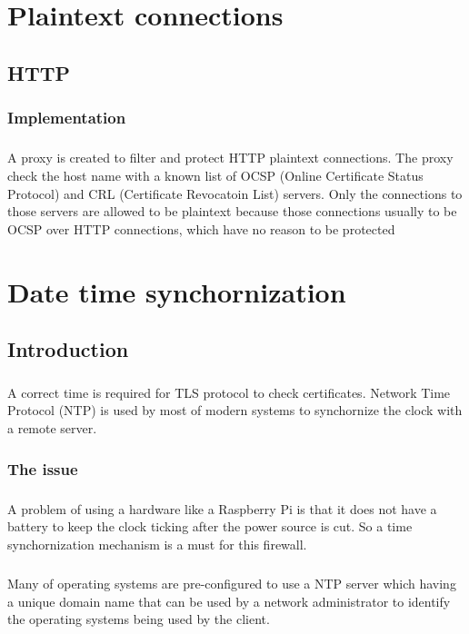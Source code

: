 \documentclass[mscthesis]{usiinfthesis}
\begin{document}
\chapter{Plaintext connections}

\section{HTTP}
\subsection{Implementation}
\paragraph{}
A proxy is created to filter and protect HTTP plaintext connections. The proxy check the host name with a known list of OCSP (Online Certificate Status Protocol) and CRL (Certificate Revocatoin List) servers. Only the connections to those servers are allowed to be plaintext because those connections usually to be OCSP over HTTP connections, which have no reason to be protected


\chapter{Date time synchornization}
\section{Introduction}
\paragraph{}
A correct time is required for TLS protocol to check certificates. Network Time Protocol (NTP) is used by most of modern systems to synchornize the clock with a remote server.
\subsection{The issue}
\paragraph{}
A problem of using a hardware like a Raspberry Pi is that it does not have a battery to keep the clock ticking after the power source is cut. So a time synchornization mechanism is a must for this firewall.
\paragraph{}
Many of operating systems are pre-configured to use a NTP server which having a unique domain name that can be used by a network administrator to identify the operating systems being used by the client.
\end{document}

